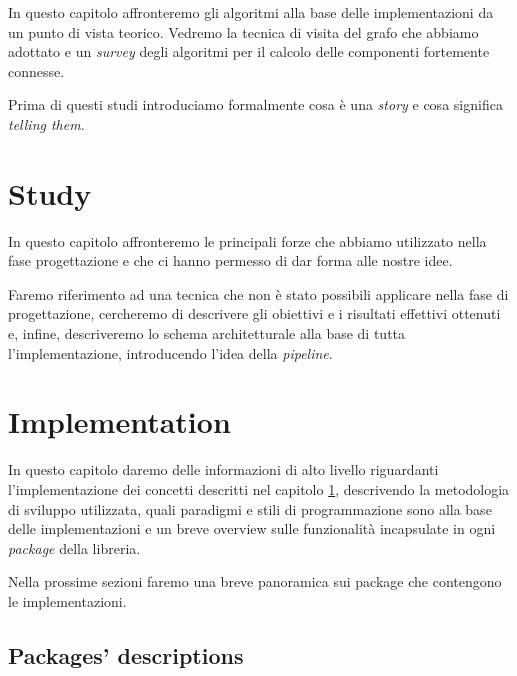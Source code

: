 \documentclass[twoside,openright,titlepage,fleqn,
	headinclude,11pt,a4paper,BCOR5mm,footinclude
	]{scrbook}
\begin{document}
In questo capitolo affronteremo gli algoritmi alla base delle
implementazioni da un punto di vista teorico. Vedremo la tecnica di
visita del grafo che abbiamo adottato e un \emph{survey} degli
algoritmi per il calcolo delle componenti fortemente connesse.

Prima di questi studi introduciamo formalmente cosa \`e una
\emph{story} e cosa significa \emph{telling them}.



\chapter{Study}
\label{chapter:study}

In questo capitolo affronteremo le principali forze che abbiamo
utilizzato nella fase progettazione e che ci hanno permesso di dar
forma alle nostre idee. 

Faremo riferimento ad una tecnica che non \`e stato possibili
applicare nella fase di progettazione, cercheremo di descrivere gli
obiettivi e i risultati effettivi ottenuti e, infine, descriveremo lo
schema architetturale alla base di tutta l'implementazione,
introducendo l'idea della \emph{pipeline}.



% 


\chapter{Implementation}
\label{chapter:implementation}
In questo capitolo daremo delle informazioni di alto livello
riguardanti l'implementazione dei concetti descritti nel capitolo
\ref{chapter:study}, descrivendo la metodologia di sviluppo
utilizzata, quali paradigmi e stili di programmazione sono alla base
delle implementazioni e un breve overview sulle funzionalit\`a
incapsulate in ogni \emph{package} della libreria.





Nella prossime sezioni faremo una breve panoramica sui package che
contengono le implementazioni.

\section{Packages' descriptions}
\label{section:packages-descriptions}
\end{document}
